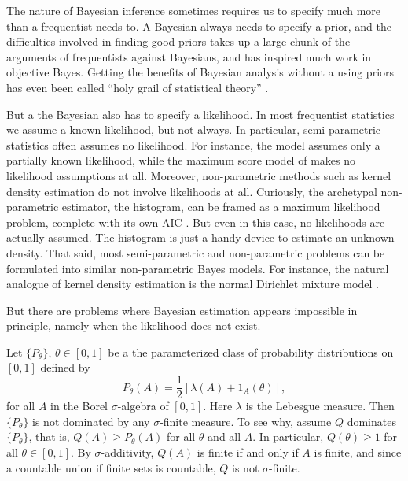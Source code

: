 The nature of Bayesian inference sometimes requires us to specify
much more than a frequentist needs to. A Bayesian always needs to
specify a prior, and the difficulties involved in finding good priors
takes up a large chunk of the arguments of frequentists against Bayesians,
and has inspired much work in objective Bayes. Getting the benefits
of Bayesian analysis without a using priors has even been called ``holy
grail of statistical theory'' \parencite{Efron2010-is}. 

But a the Bayesian also has to specify a likelihood. In most frequentist
statistics we assume a known likelihood, but not always. In particular,
semi-parametric statistics often assumes no likelihood. For instance,
the \cite{Cox1972-xd} model assumes only a partially known likelihood,
while the maximum score model of \cite{Manski1975-gl} makes no likelihood
assumptions at all. Moreover, non-parametric methods such as kernel
density estimation \parencite{Silverman1986-nt} do not involve likelihoods
at all. Curiously, the archetypal non-parametric estimator, the histogram,
can be framed as a maximum likelihood problem, complete with its own
AIC \parencite{Birge2006-nl}. But even in this case, no likelihoods are
actually assumed. The histogram is just a handy device to estimate
an unknown density. That said, most semi-parametric and non-parametric
problems can be formulated into similar non-parametric Bayes models.
For instance, the natural analogue of kernel density estimation is
the normal Dirichlet mixture model \parencite[Chapter 2.2]{Muller2015-xn}.

But there are problems where Bayesian estimation appears impossible
in principle, namely when the likelihood does not exist.
\begin{example}
\label{exa:no likelihood}Let $\{P_{\theta}\},\,\theta\in[0,1]$
be a the parameterized class of probability distributions on $[0,1]$
defined by
\begin{equation}
P_{\theta}(A)=\frac{1}{2}[\lambda(A)+1_{A}(\theta)],\label{eq:no likelihood}
\end{equation}
for all $A$ in the Borel $\sigma$-algebra of $[0,1]$. Here $\lambda$
is the Lebesgue measure. Then $\{P_{\theta}\}$ is not dominated by
any $\sigma$-finite measure. To see why, assume $Q$ dominates $\{P_{\theta}\}$,
that is, $Q(A)\geq P_{\theta}(A)$ for all $\theta$ and all $A$.
In particular, $Q(\theta)\geq1$ for all $\theta\in[0,1]$. By $\sigma$-additivity,
$Q(A)$ is finite if and only if $A$ is finite, and since a countable
union if finite sets is countable, $Q$ is not $\sigma$-finite.
\end{example}

